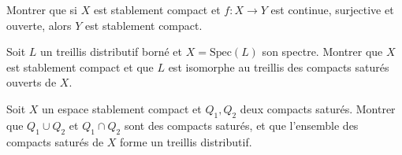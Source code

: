 \begin{exercice}
Montrer que si $X$ est stablement compact et $f\colon X \to Y$ est continue, surjective
et ouverte, alors $Y$ est stablement compact.
\end{exercice}

\begin{exercice}
Soit $L$ un treillis distributif born\'e et $X = \mathrm{Spec}(L)$ son spectre. Montrer
que $X$ est stablement compact et que $L$ est isomorphe au treillis des compacts satur\'es
ouverts de $X$.
\end{exercice}

\begin{exercice}
Soit $X$ un espace stablement compact et $Q_1, Q_2$ deux compacts satur\'es. Montrer que
$Q_1 \cup Q_2$ et $Q_1 \cap Q_2$ sont des compacts satur\'es, et que l'ensemble des
compacts satur\'es de $X$ forme un treillis distributif.
\end{exercice}
